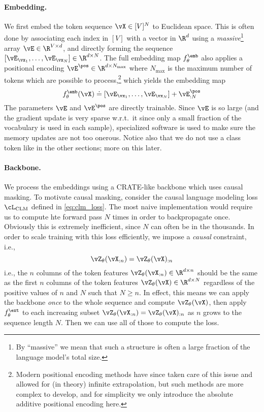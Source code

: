 \documentclass[../../book-main.tex]{subfiles}
\begin{document}
\paragraph{Embedding.} We first embed the token sequence \(\vX \in [V]^{N}\) to Euclidean space. This is often done by associating each index in \([V]\) with a vector in \(\R^{d}\) using a \textit{massive}\footnote{By ``massive'' we mean that such a structure is often a large fraction of the language model's total size.} array \(\vE \in \R^{V \times d}\), and directly forming the sequence \([\vE_{\vx_{1}}, \dots, \vE_{\vx_{N}}] \in \R^{d \times N}\). The full embedding map \(f_{\theta}^{\emb}\) also applies a positional encoding \(\vE^{\pos} \in \R^{d  \times N_{\max}}\) where \(N_{\max}\) is the maximum number of tokens which are possible to process,\footnote{Modern positional encoding methods have since taken care of this issue and allowed for (in theory) infinite extrapolation, but such methods are more complex to develop, and for simplicity we only introduce the absolute additive positional encoding here.} which yields the embedding map 
\begin{equation}
    f_{\theta}^{\emb}(\vX) \doteq [\vE_{\vx_{1}}, \dots, \vE_{\vx_{N}}] + \vE_{:N}^{\pos}
\end{equation}
The parameters \(\vE\) and \(\vE^{\pos}\) are directly trainable. Since \(\vE\) is so large (and the gradient update is very sparse w.r.t.~it since only a small fraction of the vocabulary is used in each sample), specialized software is used to make sure the memory updates are not too onerous. Notice also that we do not use a class token like in the other sections; more on this later.

\paragraph{Backbone.} We process the embeddings using a CRATE-like backbone which uses causal masking. To motivate causal masking, consider the causal language modeling loss \(\cL_{\mathrm{CLM}}\) defined in \eqref{eq:clm_loss}. The most naive implementation would require us to compute hte forward pass \(N\) times in order to backpropagate once. Obviously this is extremely inefficient, since \(N\) can often be in the thousands. In order to scale training with this loss efficiently, we impose a \textit{causal} constraint, i.e.,
\begin{equation}\label{eq:causal_backbone_def}
    \vZ_{\theta}(\vX_{:n}) = \vZ_{\theta}(\vX)_{:n}
\end{equation}
i.e., the \(n\) columns of the token features \(\vZ_{\theta}(\vX_{:n}) \in \R^{d \times n}\) should be the same as the first \(n\) columns of the token features \(\vZ_{\theta}(\vX) \in \R^{d \times N}\) regardless of the positive values of \(n\) and \(N\) such that \(N \geq n\). In effect, this means we can apply the backbone \textit{once} to the whole sequence and compute \(\vZ_{\theta}(\vX)\), then apply \(f_{\theta}^{\ext}\) to each increasing subset \(\vZ_{\theta}(\vX_{:n}) = \vZ_{\theta}(\vX)_{:n}\) as \(n\) grows to the sequence length \(N\). Then we can use all of those to compute the loss.
\end{document}
